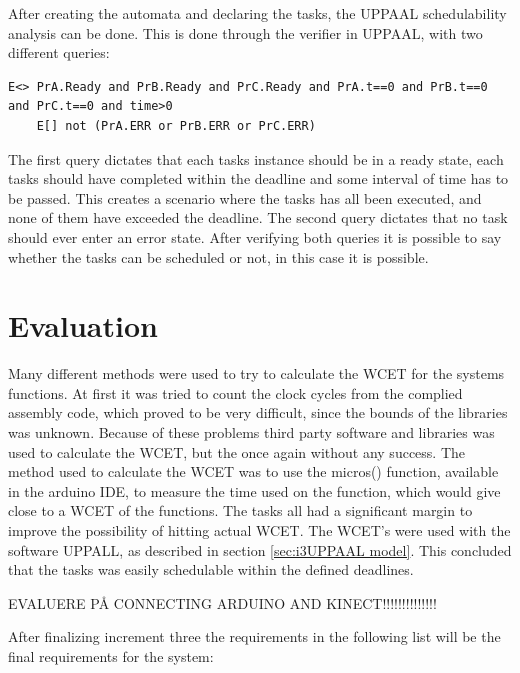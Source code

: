 After creating the automata and declaring the tasks, the UPPAAL schedulability analysis can be done. This is done through the verifier in UPPAAL, with two different queries:

\begin{lstlisting}[caption={Queries for UPPAAL}, label={QueriesAppendix}]
	E<> PrA.Ready and PrB.Ready and PrC.Ready and PrA.t==0 and PrB.t==0 and PrC.t==0 and time>0
	E[] not (PrA.ERR or PrB.ERR or PrC.ERR)
\end{lstlisting}

The first query dictates that each tasks instance should be in a ready state, each tasks should have completed within the deadline and some interval of time has to be passed. This creates a scenario where the tasks has all been executed, and none of them have exceeded the deadline.
The second query dictates that no task should ever enter an error state.
After verifying both queries it is possible to say whether the tasks can be scheduled or not, in this case it is possible.

\section{Evaluation}
\label{sec:i3Evaluation}
Many different methods were used to try to calculate the WCET for the systems functions. At first it was tried to count the clock cycles from the complied assembly code, which proved to be very difficult, since the bounds of the libraries was unknown. Because of these problems third party software and libraries was used to calculate the WCET, but the once again without any success. The method used to calculate the WCET was to use the micros() function, available in the arduino IDE, to measure the time used on the function, which would give close to a WCET of the functions. The tasks all had a significant margin to improve the possibility of hitting actual WCET. \newline
The WCET's were used with the software UPPALL, as described in section \ref{sec:i3UPPAAL model}. This concluded that the tasks was easily schedulable within the defined deadlines.

EVALUERE PÅ CONNECTING ARDUINO AND KINECT!!!!!!!!!!!!!!

After finalizing increment three the requirements in the following list will be the final requirements for the system:

